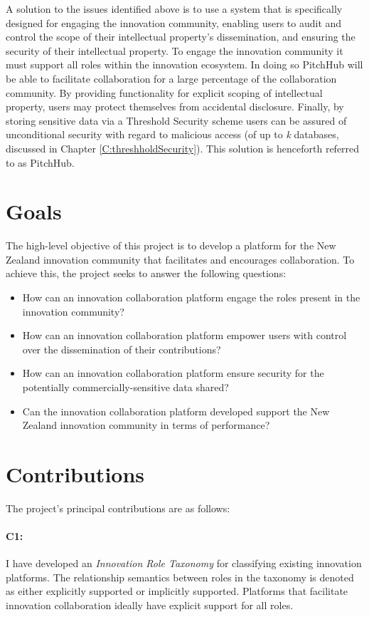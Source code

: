 A solution to the issues identified above is to use a system that is specifically designed for engaging the innovation community, enabling users to audit and control the scope of their intellectual property's dissemination, and ensuring the security of their intellectual property. To engage the innovation community it must support all roles within the innovation ecosystem. In doing so PitchHub will be able to facilitate collaboration for a large percentage of the collaboration community. By providing functionality for explicit scoping of intellectual property, users may protect themselves from accidental disclosure. Finally, by storing sensitive data via a Threshold Security scheme users can be assured of unconditional security with regard to malicious access (of up to \textit{k} databases, discussed in Chapter \ref{C:threshholdSecurity}). This solution is henceforth referred to as PitchHub.

\section{Goals}\label{S:goals}

The high-level objective of this project is to develop a platform for the New Zealand innovation community that facilitates and encourages collaboration. To achieve this, the project seeks to answer the following questions: 

\begin{itemize}
  \item How can an innovation collaboration platform engage the roles present in the innovation community?
  \item How can an innovation collaboration platform empower users with control over the dissemination of their contributions?
  \item How can an innovation collaboration platform ensure security for the potentially commercially-sensitive data shared?
  \item Can the innovation collaboration platform developed support the New Zealand innovation community in terms of performance?
\end{itemize}

\section{Contributions}

The project's principal contributions are as follows:

\paragraph{C1:} I have developed an {\em Innovation Role Taxonomy} for classifying existing innovation platforms. The relationship semantics between roles in the taxonomy is denoted as either explicitly supported or implicitly supported. Platforms that facilitate innovation collaboration ideally have explicit support for all roles.


